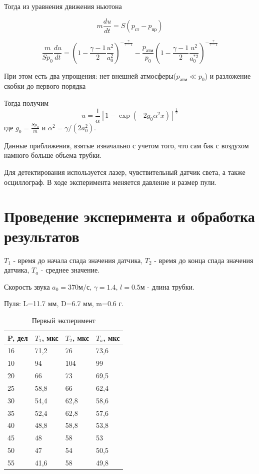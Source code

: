 \documentclass[12pt,a4paper]{article}
\begin{document}
Тогда из уравнения движения ньютона

\begin{equation}
    m\frac{du}{dt}=S(p_{ст}-p_{пр})
\end{equation}

\begin{equation}
     \frac{m}{Sp_0}\frac{du}{dt}=\left( 1 - \frac{\gamma-1}{2}\frac{u^2}{a_0^2} \right)^{-\frac{\gamma}{\gamma-1}}-\frac{p_{атм}}{p_0}\left( 1 - \frac{\gamma-1}{2}\frac{u^2}{a_0^{*2}} \right)^{-\frac{\gamma}{\gamma-1}}
\end{equation}

При этом есть два упрощения: нет внешней атмосферы($p_{атм}\ll p_0$) и разложение скобки до первого порядка

Тогда получим
\begin{equation}
    u=\frac{1}{\alpha}[1-\exp{(-2g_0 \alpha^2 x)}]^\frac{1}2{}
\end{equation}
где $g_0=\frac{Sp_0}{m}$ и $\alpha^2=\gamma/(2a_0^2)$.

Данные приближения, взятые изначально с учетом того, что сам бак с воздухом намного больше объема трубки. 

Для детектирования используется лазер, чувствительный датчик света, а также осциллограф. В ходе эксперимента меняется давление и размер пули.

\newpage

\section{ Проведение эксперимента и обработка результатов}

$T_1$ - время до начала спада значения датчика, $T_2$ - время до конца спада значения датчика, $T_a$ - среднее значение.

Скорость звука $a_0=370 м/с$, $\gamma=1.4$, $l=0.5м$ - длина трубки.

Пуля: L=11.7 мм, D=6.7 мм, m=0.6 г. 

\begin{table}[H]
    \centering
    \caption{Первый эксперимент}
    \begin{tabular}{|l|l|l|l|}
    \hline
        P, дел & $T_1$, мкс & $T_2$, мкс & $T_a$, мкс \\ \hline
        16 & 71,2 & 76 & 73,6 \\ \hline
        10 & 94 & 104 & 99 \\ \hline
        20 & 66 & 73 & 69,5 \\ \hline
        25 & 58,8 & 66 & 62,4 \\ \hline
        30 & 54,4 & 62,8 & 58,6 \\ \hline
        35 & 52,4 & 62,8 & 57,6 \\ \hline
        40 & 48,8 & 58,8 & 53,8 \\ \hline
        45 & 48 & 58 & 53 \\ \hline
        50 & 47 & 54 & 50,5 \\ \hline
        55 & 41,6 & 58 & 49,8 \\ \hline
    \end{tabular}
\end{table}
\end{document}
